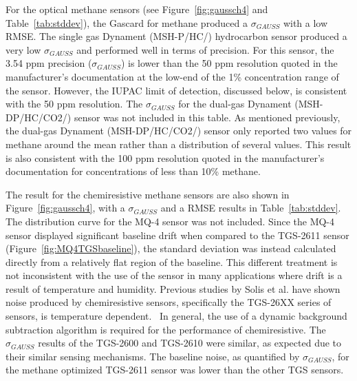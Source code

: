 \documentclass[times]{joehreview}
\begin{document}
	For the optical methane sensors (see Figure~\ref{fig:gaussch4} and Table~\ref{tab:stddev}), the Gascard for methane produced a $\sigma_{GAUSS}$ with a low RMSE. The single gas Dynament (MSH-P/HC/) hydrocarbon sensor produced a very low $\sigma_{GAUSS}$ and performed well in terms of precision.  For this sensor, the 3.54 ppm precision ($\sigma_{GAUSS}$) is lower than the 50 ppm resolution quoted in the manufacturer's documentation at the low-end of the 1\% concentration range of the sensor.  However, the IUPAC limit of detection, discussed below, is consistent with the 50 ppm resolution.  The $\sigma_{GAUSS}$ for the dual-gas Dynament (MSH-DP/HC/CO2/) sensor was not included in this table.  As mentioned previously, the dual-gas Dynament (MSH-DP/HC/CO2/) sensor only reported two values for methane around the mean rather than a distribution of several values.  This result is also consistent with the 100 ppm resolution quoted in the manufacturer's documentation for concentrations of less than 10\% methane.  
	
	The result for the chemiresistive methane sensors are also shown in Figure~\ref{fig:gaussch4}, with a $\sigma_{GAUSS}$ and a RMSE results in Table~\ref{tab:stddev}.  The distribution curve for the MQ-4 sensor was not included.  Since the MQ-4 sensor displayed significant baseline drift when compared to the TGS-2611 sensor (Figure~\ref{fig:MQ4TGSbaseline}), the standard deviation was instead calculated directly from a relatively flat region of the baseline.  This different treatment is not inconsistent with the use of the sensor in many applications where drift is a result of temperature and humidity.  Previous studies by Solis et al. have shown noise produced by chemiresistive sensors, specifically the TGS-26XX series of sensors, is temperature dependent.~\cite{solis_fluctuation-enhanced_2005} In general, the use of a dynamic background subtraction algorithm is required for the performance of chemiresistive.  The $\sigma_{GAUSS}$ results of the TGS-2600 and TGS-2610 were similar, as expected due to their similar sensing mechanisms.  The baseline noise, as quantified by $\sigma_{GAUSS}$, for the methane optimized TGS-2611 sensor was lower than the other TGS sensors.
	
\end{document}
